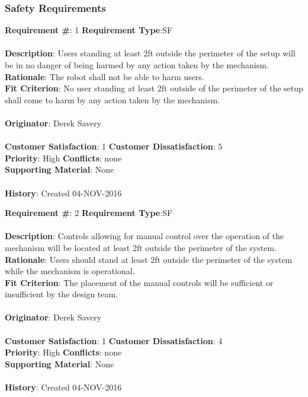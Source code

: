 \documentclass[titlepage]{article}
\begin{document}
\subsubsection{Safety Requirements}

\begin{framed}
	\noindent\textbf{Requirement \#}: 1 \hfill \textbf{Requirement Type}:SF \hfill\\\\
	\noindent\textbf{Description}: Users standing at least 2ft outside the perimeter of the setup will be in no danger of being harmed by any action taken by the mechanism.\\
	\textbf{Rationale}: The robot shall not be able to harm users.\\
	\textbf{Fit Criterion}: No user standing at least 2ft outside of the perimeter of the setup shall come to harm by any action taken by the mechanism.\\\\
	\textbf{Originator}: Derek Savery\\\\
	\noindent\textbf{Customer Satisfaction}: 1 \hfill 	\textbf{Customer Dissatisfaction}: 5 \hfill\\
	\textbf{Priority}: High \hfill \textbf{Conflicts}: none \hfill\\
	\textbf{Supporting Material}: None\\\\
	\noindent\textbf{History}: Created 04-NOV-2016
\end{framed}

\begin{framed}
	\noindent\textbf{Requirement \#}: 2 \hfill \textbf{Requirement Type}:SF \hfill\\\\
	\noindent\textbf{Description}: Controls allowing for manual control over the operation of the mechanism will be located at least 2ft outside the perimeter of the system.\\
	\textbf{Rationale}: Users should stand at least 2ft outside the perimeter of the system while the mechanism is operational.\\
	\textbf{Fit Criterion}: The placement of the manual controls will be sufficient or insufficient by the design team.\\\\
	\textbf{Originator}: Derek Savery\\\\
	\noindent\textbf{Customer Satisfaction}: 1 \hfill 	\textbf{Customer Dissatisfaction}: 4 \hfill\\
	\textbf{Priority}: High \hfill \textbf{Conflicts}: none \hfill\\
	\textbf{Supporting Material}: None\\\\
	\noindent\textbf{History}: Created 04-NOV-2016
\end{framed}
\end{document}

